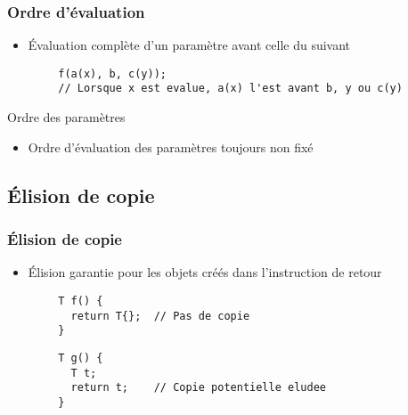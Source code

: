 \documentclass[C++.tex]{subfiles}
\begin{document}
\begin{frame}[fragile]
	\frametitle{Ordre d'évaluation}
	\begin{itemize}
		\item Évaluation complète d'un paramètre avant celle du suivant
	\end{itemize}

	\begin{verbatim}
		f(a(x), b, c(y));
		// Lorsque x est evalue, a(x) l'est avant b, y ou c(y)
	\end{verbatim}

	\begin{alertblock}{Ordre des paramètres}
		\begin{itemize}
			\item Ordre d'évaluation des paramètres toujours non fixé
		\end{itemize}
	\end{alertblock}

\end{frame}

\subsection*{Élision de copie}
\begin{frame}[fragile]
	\frametitle{Élision de copie}
	\begin{itemize}
		\item Élision garantie pour les objets créés dans l'instruction de retour
	\end{itemize}

	\begin{verbatim}
		T f() {
		  return T{};  // Pas de copie
		}
	\end{verbatim}

	\begin{verbatim}
		T g() {
		  T t;
		  return t;    // Copie potentielle eludee
		}
	\end{verbatim}

\end{frame}
\end{document}
